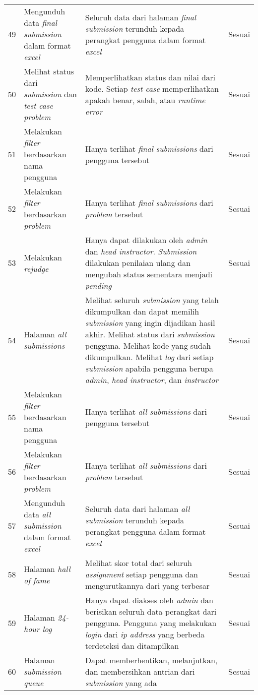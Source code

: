 \begin{longtable}[H]{|p{0.5cm}| p{5.5cm}| p{6cm}| p{2.5cm}|}
49 & Mengunduh data \textit{final submission} dalam format \textit{excel} & Seluruh data dari halaman \textit{final submission} terunduh kepada perangkat pengguna dalam format \textit{excel} & Sesuai\\ \cline{1-4}
50 & Melihat status dari \textit{submission} dan \textit{test case problem} & Memperlihatkan status dan nilai dari kode. Setiap \textit{test case} memperlihatkan apakah benar, salah, atau \textit{runtime error} & Sesuai\\ \cline{1-4}
51 & Melakukan \textit{filter} berdasarkan nama pengguna & Hanya terlihat \textit{final submissions} dari pengguna tersebut & Sesuai\\ \cline{1-4}
52 & Melakukan \textit{filter} berdasarkan \textit{problem} & Hanya terlihat \textit{final submissions} dari \textit{problem} tersebut & Sesuai\\ \cline{1-4}
53 & Melakukan \textit{rejudge} & Hanya dapat dilakukan oleh \textit{admin} dan \textit{head instructor}. \textit{Submission} dilakukan penilaian ulang dan mengubah status sementara menjadi \textit{pending} & Sesuai\\ \cline{1-4}
54 & Halaman \textit{all submissions} & Melihat seluruh \textit{submission} yang telah dikumpulkan dan dapat memilih \textit{submission} yang ingin dijadikan hasil akhir. Melihat status dari \textit{submission} pengguna. Melihat kode yang sudah dikumpulkan. Melihat \textit{log} dari setiap \textit{submission} apabila pengguna berupa \textit{admin}, \textit{head instructor}, dan \textit{instructor} & Sesuai\\ \cline{1-4}
55 & Melakukan \textit{filter} berdasarkan nama pengguna & Hanya terlihat \textit{all submissions} dari pengguna tersebut & Sesuai\\ \cline{1-4}
56 & Melakukan \textit{filter} berdasarkan \textit{problem} & Hanya terlihat \textit{all submissions} dari \textit{problem} tersebut & Sesuai\\ \cline{1-4}
57 & Mengunduh data \textit{all submission} dalam format \textit{excel} & Seluruh data dari halaman \textit{all submission} terunduh kepada perangkat pengguna dalam format \textit{excel} & Sesuai\\ \cline{1-4}
58 & Halaman \textit{hall of fame} & Melihat skor total dari seluruh \textit{assignment} setiap pengguna dan mengurutkannya dari yang terbesar & Sesuai\\ \cline{1-4}
59 & Halaman \textit{24-hour log} & Hanya dapat diakses oleh \textit{admin} dan berisikan seluruh data perangkat dari pengguna. Pengguna yang melakukan \textit{login} dari \textit{ip address} yang berbeda terdeteksi dan ditampilkan & Sesuai\\ \cline{1-4}
60 & Halaman \textit{submission queue} & Dapat memberhentikan, melanjutkan, dan membersihkan antrian dari \textit{submission} yang ada & Sesuai\\ \cline{1-4}
\end{longtable}

